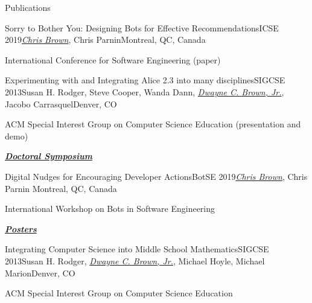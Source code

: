 \documentclass{resume} %
\begin{document}
\begin{rSection}{Publications}
\begin{pSubsection}{Sorry to Bother You: Designing Bots for Effective Recommendations}{ICSE 2019}{\textit{\underline{Chris Brown}}, Chris Parnin}{Montreal, QC, Canada}
\item International Conference for Software Engineering (paper)
\end{pSubsection}
\begin{pSubsection}{Experimenting with and Integrating Alice 2.3 into many disciplines}{SIGCSE 2013}{Susan H. Rodger, Steve Cooper, Wanda Dann, \textit{\underline{Dwayne C. Brown, Jr.}}, Jacobo Carrasquel}{Denver, CO}
\item ACM Special Interest Group on Computer Science Education (presentation and demo)
\end{pSubsection}
\underline{\textbf{\textit{Doctoral Symposium}}}

\begin{pSubsection}{Digital Nudges for Encouraging Developer Actions}{BotSE 2019}{\textit{\underline{Chris Brown}}, Chris Parnin
}{Montreal, QC, Canada}
\item International Workshop on Bots in Software Engineering
\end{pSubsection}
\underline{\textbf{\textit{Posters}}}

\begin{pSubsection}{Integrating Computer Science into Middle School Mathematics}{SIGCSE 2013}{Susan H. Rodger, \textit{\underline{Dwayne C. Brown, Jr.}}, Michael Hoyle, Michael Marion}{Denver, CO}
\item ACM Special Interest Group on Computer Science Education
\end{pSubsection}
\end{rSection}


\end{document}
